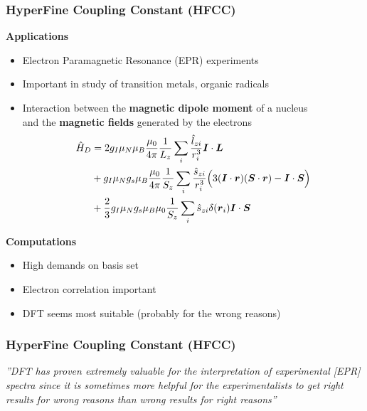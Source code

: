 \begin{frame}
\frametitle{HyperFine Coupling Constant (HFCC)}
\scriptsize

\textbf{Applications}
\begin{itemize}
\item Electron Paramagnetic Resonance (EPR) experiments
\item Important in study of transition metals, organic radicals
\item Interaction between the \textbf{magnetic dipole moment} of a nucleus\\
      and the \textbf{magnetic fields} generated by the electrons 
\pause
\begin{align}
    \nonumber
    \hat{H}_D &= 2g_I\mu_N\mu_B\frac{\mu_0}{4\pi}\frac{1}{L_z}\sum_i\frac{\hat{l}_{zi}}{r_i^3}\boldsymbol I\cdot\boldsymbol L\\
    \nonumber
              &+ g_I\mu_Ng_s\mu_B\frac{\mu_0}{4\pi}\frac{1}{S_z}\sum_i\frac{\hat{s}_{zi}}{r_i^3}\Big(3(\boldsymbol I\cdot\boldsymbol r)(\boldsymbol S\cdot\boldsymbol r)-\boldsymbol I\cdot\boldsymbol S\Big)\\
    \nonumber
              &+ \frac{2}{3}g_I\mu_Ng_s\mu_B\mu_0\frac{1}{S_z}\sum_i\hat{s}_{zi}\delta(\boldsymbol r_i)\boldsymbol I\cdot\boldsymbol S
\end{align}
\end{itemize}


\pause
\textbf{Computations}
\begin{itemize}
\item High demands on basis set
\item Electron correlation important
\item DFT seems most suitable (probably for the wrong reasons)
\end{itemize}

\end{frame}

\begin{frame}
\frametitle{HyperFine Coupling Constant (HFCC)}
\centering
    \begin{exampleblock}{{\it{''DFT has proven extremely valuable for the
    interpretation of experimental [EPR] spectra since it is sometimes more
    helpful for the experimentalists to get right results for wrong reasons
    than wrong results for right reasons''}}}
    \vskip2mm
    \hspace*{}
\end{exampleblock}
\end{frame}

